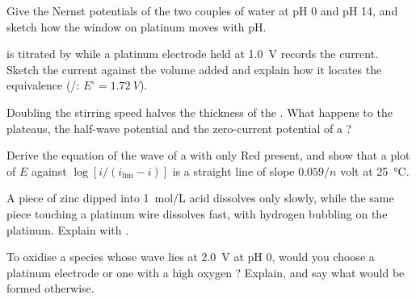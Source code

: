 \begin{exercise}[$\star\star$]\label{exo:b2:current-potential-curves:7}
Give the Nernst potentials of the two couples of water at pH 0 and pH 14, and
sketch how the window on platinum moves with pH.
\end{exercise}

\begin{exercise}[$\star\star$]\label{exo:b2:current-potential-curves:8}
 is titrated by  while a platinum electrode held at
\qty{1.0}{V} records the current. Sketch the current against the volume added
and explain how it locates the equivalence (/: $E^\circ =
\qty{1.72}{V}$).
\end{exercise}

\begin{exercise}[$\star\star$]\label{exo:b2:current-potential-curves:9}
Doubling the stirring speed halves the thickness of the . What
happens to the plateaus, the half-wave potential and the zero-current
potential of a ?
\end{exercise}

\begin{exercise}[$\star\star\star$]\label{exo:b2:current-potential-curves:10}
Derive the equation of the wave of a  with only Red present, and
show that a plot of $E$ against $\log[i/(i_{\lim} - i)]$ is a straight line of
slope $0.059/n$ volt at \qty{25}{\degreeCelsius}.
\end{exercise}

\begin{exercise}[$\star\star\star$]\label{exo:b2:current-potential-curves:11}
A piece of zinc dipped into \qty{1}{mol/L} acid dissolves only slowly, while
the same piece touching a platinum wire dissolves fast, with hydrogen bubbling
on the platinum. Explain with .
\end{exercise}

\begin{exercise}[$\star\star\star$]\label{exo:b2:current-potential-curves:12}
To oxidise a species whose wave lies at \qty{2.0}{V} at pH 0, would you choose a
platinum electrode or one with a high oxygen ? Explain, and say
what would be formed otherwise.
\end{exercise}

